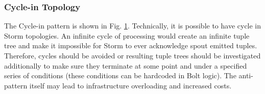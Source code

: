\begin{figure}
\centering 
{}\label{fig:multi-anchoring}
\hspace{1cm}
\label{fig:cycle}
\end{figure}


\subsubsection{Cycle-in Topology}

The Cycle-in pattern is shown in Fig. \ref{fig:cycle}. Technically, it is possible to have cycle in Storm topologies. An infinite cycle of processing would create an infinite tuple tree and make it impossible for Storm to ever acknowledge spout emitted tuples. Therefore, cycles should be avoided or resulting tuple trees should be investigated additionally to make sure they terminate at some point and under a specified series of conditions (these conditions can be hardcoded in Bolt logic). The anti-pattern itself may lead to infrastructure overloading and increased costs.


